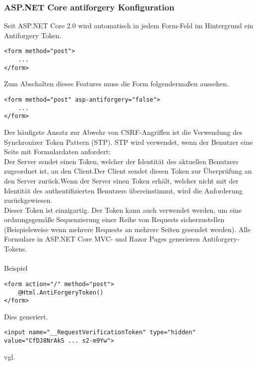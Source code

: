 {\subsubsection{ASP.NET Core antiforgery Konfiguration}
Seit ASP.NET Core 2.0 wird automatisch in jedem Form-Feld im Hintergrund ein Antiforgery Token.
\begin{lstlisting}[caption={ASP.NET Antiforgery}]
<form method="post">
    ...
</form>
\end{lstlisting}
Zum Abschalten dieses Features muss die Form folgendermaßen aussehen.
\begin{lstlisting}[caption={ASP.NET Antiforgery deaktivieren}]
<form method="post" asp-antiforgery="false">
    ...
</form>
\end{lstlisting}
Der häufigste Ansatz zur Abwehr von CSRF-Angriffen ist die Verwendung des Synchronizer Token Pattern (STP). STP wird verwendet, wenn der Benutzer eine Seite mit Formulardaten anfordert:\\Der Server sendet einen Token, welcher der Identität des aktuellen Benutzers zugeordnet ist, an den Client.Der Client sendet diesen Token zur Überprüfung an den Server zurück.Wenn der Server einen Token erhält, welcher nicht mit der Identität des authentifizierten Benutzers übereinstimmt, wird die Anforderung zurückgewiesen.\\Dieser Token ist einzigartig. Der Token kann auch verwendet werden, um eine ordnungsgemäße Sequenzierung einer Reihe von Requests sicherzustellen (Beispielsweise wenn mehrere Requests an mehrere Seiten gesendet werden). Alle Formulare in ASP.NET Core MVC- und Razor Pages generieren Antiforgery-Tokens.\\ \\Beispiel\\
\begin{lstlisting}[caption={ASP.NET Antiforgery form header}]
<form action="/" method="post">
    @Html.AntiForgeryToken()
</form>
\end{lstlisting}
Dies generiert.\\
\begin{lstlisting}[caption={ASP.NET Antiforgery generierter input}]
<input name="__RequestVerificationToken" type="hidden" value="CfDJ8NrAkS ... s2-m9Yw">
\end{lstlisting}
vgl. \textcite{CSRF-Protection}
}
